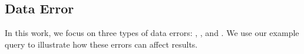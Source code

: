 
%


\subsection{Data Error}\label{subsec:dataclean}
In this work, we focus on three types of data errors: \verror, \cerror, and \derror.
We use our example query to illustrate how these errors can affect results.


